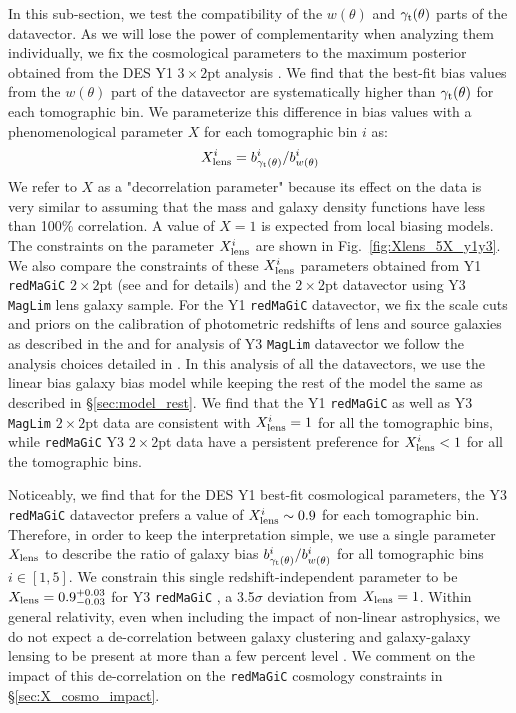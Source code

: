 \documentclass[aps, prd,twocolumn,superscriptaddress,nofootinbib,preprintnumbers]{revtex4-1}
\newcommand{\gammat}{\ensuremath{\gamma_{\rm t}(\theta)}}
\newcommand{\wtheta}{\ensuremath{w(\theta)}}
\newcommand{\redmagic}{\texttt{redMaGiC} }
\newcommand{\maglim}{\texttt{MagLim} }
\begin{document}
In this sub-section, we test the compatibility of the $\wtheta$ and $\gammat$ parts of the datavector. As we will lose the power of complementarity when analyzing them individually, we fix the cosmological parameters to the maximum posterior obtained from the DES Y1 $3\times 2$pt analysis \citep{Abbott_2018}. We find that the best-fit bias values from the $\wtheta$ part of the datavector are systematically higher than $\gammat$ for each tomographic bin. We parameterize this difference in bias values with a phenomenological parameter $X$ for each tomographic bin $i$ as:
\begin{equation}
    X^{i}_{\rm lens} = b^i_{\gammat}/b^i_{\wtheta}
\end{equation}
We refer to $X$ as a "decorrelation parameter" because its effect on the data is very similar to assuming that the mass and galaxy density functions have less than 100\% correlation.  A value of $X=1$ is expected from local biasing models.
The constraints on the parameter $X^{i}_{\rm lens}$ are shown in Fig.~\ref{fig:Xlens_5X_y1y3}. We also compare the constraints of these $X^{i}_{\rm lens}$ parameters obtained from Y1 \redmagic $2 \times 2$pt (see \citet*{Abbott_2018} and \citet*{gglpaper} for details) and the $2 \times 2$pt datavector using Y3 \maglim lens galaxy sample. For the Y1 \redmagic datavector,  we fix the scale cuts and priors on the calibration of photometric redshifts of lens and source galaxies as described in the \citet{Abbott_2018} and for analysis of Y3 \maglim datavector we follow the analysis choices detailed in \citet*{y3-2x2ptaltlensresults}. In this analysis of all the datavectors, we use the linear bias galaxy bias model while keeping the rest of the model the same as described in \S\ref{sec:model_rest}. We find that the Y1 \redmagic as well as Y3 \maglim $2\times 2$pt data are consistent with $X^{i}_{\rm lens} = 1$ for all the tomographic bins, while \redmagic Y3 $2\times 2$pt data have a persistent preference for $X^{i}_{\rm lens} < 1$ for all the tomographic bins.

Noticeably, we find that for the DES Y1 best-fit cosmological parameters, the Y3 \redmagic datavector prefers a value of $X^{i}_{\rm lens} \sim 0.9$ for each tomographic bin. Therefore, in order to keep the interpretation simple, we use a single parameter $X_{\rm lens}$ to describe the ratio of galaxy bias $b^i_{\gammat}/b^i_{\wtheta}$ for all tomographic bins $ i \in [1,5]$. We constrain this single redshift-independent parameter to be $X_{\rm lens} = 0.9^{+0.03}_{-0.03}$ for Y3 \redmagic, a 3.5$\sigma$ deviation from $X_{\rm lens} = 1$. Within general relativity, even when including the impact of non-linear astrophysics, we do not expect a de-correlation between galaxy clustering and galaxy-galaxy lensing to be present at more than a few percent level \citep{Desjacques_2018}. We comment on the impact of this de-correlation on the \redmagic cosmology constraints in \S\ref{sec:X_cosmo_impact}. 
\end{document}
